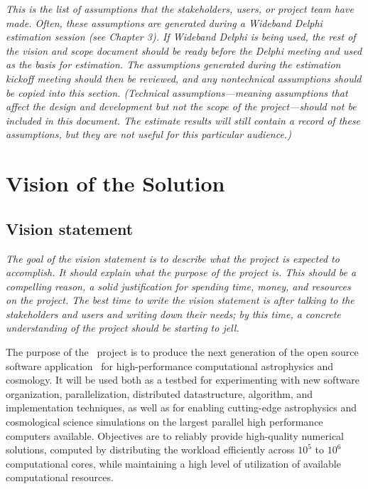 \documentclass[11pt]{article}
\begin{document}
    \textit{This is the list of assumptions that the stakeholders, users, or
    project team have made. Often, these assumptions are generated
    during a Wideband Delphi estimation session (see Chapter 3). If
    Wideband Delphi is being used, the rest of the vision and scope
    document should be ready before the Delphi meeting and used as the
    basis for estimation. The assumptions generated during the
    estimation kickoff meeting should then be reviewed, and any
    nontechnical assumptions should be copied into this
    section. (Technical assumptions---meaning assumptions that affect
    the design and development but not the scope of the
    project---should not be included in this document. The estimate
    results will still contain a record of these assumptions, but they
    are not useful for this particular audience.)}

\section{Vision of the Solution}

\subsection{Vision statement}

    \textit{The goal of the vision statement is to describe what the project
    is expected to accomplish. It should explain what the purpose of
    the project is. This should be a compelling reason, a solid
    justification for spending time, money, and resources on the
    project. The best time to write the vision statement is after
    talking to the stakeholders and users and writing down their
    needs; by this time, a concrete understanding of the project
    should be starting to jell.}

    The purpose of the \cello\ project is to produce the next
    generation of the open source software application \enzo\ for
    high-performance computational astrophysics and cosmology.  It
    will be used both as a testbed for experimenting with new software
    organization, parallelization, distributed datastructure,
    algorithm, and implementation techniques, as well as for enabling
    cutting-edge astrophysics and cosmological science simulations on
    the largest parallel high performance computers available.
    Objectives are to reliably provide high-quality numerical
    solutions, computed by distributing the workload efficiently
    across $10^5$ to $10^6$ computational cores, while maintaining a
    high level of utilization of available computational resources.
\end{document}
